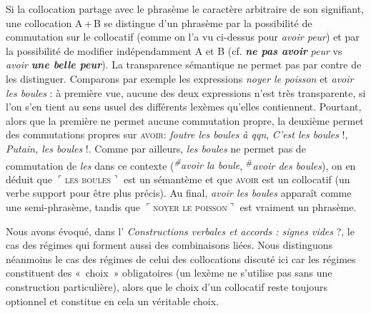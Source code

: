 Si la collocation partage avec le phrasème le caractère arbitraire de son signifiant, une collocation A\,+\,B se distingue d’un phrasème par la possibilité de commutation sur le collocatif (comme on l’a vu ci-dessus pour \textit{avoir peur}) et par la possibilité de modifier indépendamment A et B (cf. \textbf{\textit{ne pas avoir}} \textit{peur} vs \textit{avoir} \textbf{\textit{une belle peur}}). La transparence sémantique ne permet pas par contre de les distinguer. Comparons par exemple les expressions \textit{noyer le poisson} et \textit{avoir les boules} : à première vue, aucune des deux expressions n’est très transparente, si l’on s’en tient au sens usuel des différents lexèmes qu’elles contiennent. Pourtant, alors que la première ne permet aucune commutation propre, la deuxième permet des commutations propres sur \textsc{avoir}: \textit{foutre les boules à qqn}, \textit{C’est les boules} !, \textit{Putain, les boules} !. Comme par ailleurs, \textit{les boules} ne permet pas de commutation de \textit{les} dans ce contexte (\textit{\textsuperscript{\#}}\textit{avoir la boule}, \textsuperscript{\#}\textit{avoir des boules}), on en déduit que $⌜$\textsc{les} \textsc{boules}$⌝$ est un sémantème et que \textsc{avoir} est un collocatif (un verbe support pour être plus précis). Au final, \textit{avoir les boules} apparaît comme une semi-phrasème, tandis que $⌜$\textsc{noyer} \textsc{le} \textsc{poisson}$⌝$ est vraiment un phrasème.

Nous avons évoqué, dans l’ \textit{Constructions verbales et accords : signes vides} ?, le cas des régimes qui forment aussi des combinaisons liées. Nous distinguons néanmoins le cas des régimes de celui des collocations discuté ici car les régimes constituent des «~choix~» obligatoires (un lexème ne s’utilise pas sans une construction particulière), alors que le choix d’un collocatif reste toujours optionnel et constitue en cela un véritable choix.


